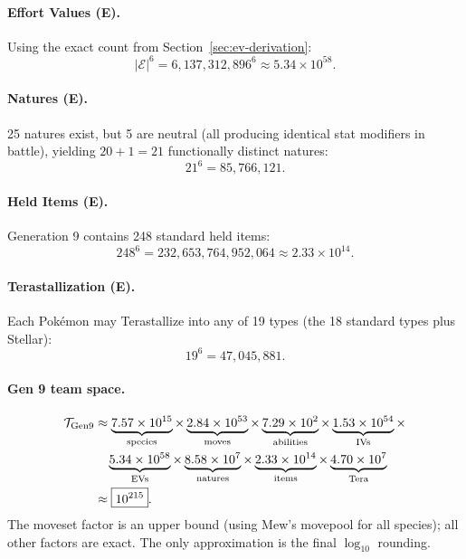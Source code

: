 \paragraph{Effort Values \textbf{(E)}.}
Using the exact count from Section~\ref{sec:ev-derivation}:
\begin{equation}
    |\mathcal{E}|^6 = 6{,}137{,}312{,}896^6 \approx 5.34 \times 10^{58}.
\end{equation}

\paragraph{Natures \textbf{(E)}.}
25 natures exist, but 5 are neutral (all producing identical stat modifiers in battle), yielding $20 + 1 = 21$ functionally distinct natures:
\begin{equation}
    21^6 = 85{,}766{,}121.
\end{equation}

\paragraph{Held Items \textbf{(E)}.}
Generation 9 contains 248 standard held items:
\begin{equation}
    248^6 = 232{,}653{,}764{,}952{,}064 \approx 2.33 \times 10^{14}.
\end{equation}

\paragraph{Terastallization \textbf{(E)}.}
Each Pokémon may Terastallize into any of 19 types (the 18 standard types plus Stellar):
\begin{equation}
    19^6 = 47{,}045{,}881.
\end{equation}

\paragraph{Gen 9 team space.}
\begin{align}
    \mathcal{T}_{\text{Gen9}}
    &\approx \underbrace{7.57 \times 10^{15}}_{\text{species}} \times
       \underbrace{2.84 \times 10^{53}}_{\text{moves}} \times
       \underbrace{7.29 \times 10^{2}}_{\text{abilities}} \times
       \underbrace{1.53 \times 10^{54}}_{\text{IVs}} \times \notag \\
    &\quad \underbrace{5.34 \times 10^{58}}_{\text{EVs}} \times
       \underbrace{8.58 \times 10^{7}}_{\text{natures}} \times
       \underbrace{2.33 \times 10^{14}}_{\text{items}} \times
       \underbrace{4.70 \times 10^{7}}_{\text{Tera}} \notag \\
    &\approx \boxed{10^{215}}.
    \label{eq:gen9-total}
\end{align}
The moveset factor is an upper bound (using Mew's movepool for all species); all other factors are exact. The only approximation is the final $\log_{10}$ rounding.

